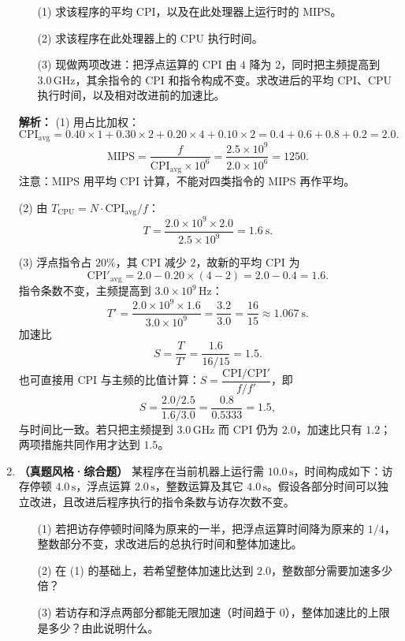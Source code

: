 \begin{enumerate}
\begin{enumerate}
    \item[(1)] 求该程序的平均 CPI，以及在此处理器上运行时的 MIPS。
    \item[(2)] 求该程序在此处理器上的 CPU 执行时间。
    \item[(3)] 现做两项改进：把浮点运算的 CPI 由 $4$ 降为 $2$，同时把主频提高到 $3.0\,\mathrm{GHz}$，其余指令的 CPI 和指令构成不变。求改进后的平均 CPI、CPU 执行时间，以及相对改进前的加速比。
\end{enumerate}

\ifshowsolutions\par\noindent\textbf{解析：}
(1) 用占比加权：
\[
\mathrm{CPI}_{\text{avg}}=0.40\times1+0.30\times2+0.20\times4+0.10\times2
=0.4+0.6+0.8+0.2=2.0.
\]
\[
\text{MIPS}=\frac{f}{\mathrm{CPI}_{\text{avg}}\times10^{6}}
=\frac{2.5\times10^{9}}{2.0\times10^{6}}=1250.
\]
注意：MIPS 用平均 CPI 计算，不能对四类指令的 MIPS 再作平均。

(2) 由 $T_{\text{CPU}}=N\cdot\mathrm{CPI}_{\text{avg}}/f$：
\[
T=\frac{2.0\times10^{9}\times2.0}{2.5\times10^{9}}=1.6\ \mathrm{s}.
\]

(3) 浮点指令占 $20\%$，其 CPI 减少 $2$，故新的平均 CPI 为
\[
\mathrm{CPI}'_{\text{avg}}=2.0-0.20\times(4-2)=2.0-0.4=1.6.
\]
指令条数不变，主频提高到 $3.0\times10^{9}\,\mathrm{Hz}$：
\[
T'=\frac{2.0\times10^{9}\times1.6}{3.0\times10^{9}}
=\frac{3.2}{3.0}=\frac{16}{15}\approx1.067\ \mathrm{s}.
\]
加速比
\[
S=\frac{T}{T'}=\frac{1.6}{16/15}=1.5.
\]
也可直接用 CPI 与主频的比值计算：$S=\dfrac{\mathrm{CPI}/\mathrm{CPI}'}{f/f'}$，即
\[
S=\frac{2.0/2.5}{1.6/3.0}=\frac{0.8}{0.5333}=1.5,
\]
与时间比一致。若只把主频提到 $3.0\,\mathrm{GHz}$ 而 CPI 仍为 $2.0$，加速比只有 $1.2$；两项措施共同作用才达到 $1.5$。

\par\noindent{}\par\noindent{}\par\noindent{}\else \answerarea[10] \fi

\item \textbf{（真题风格·综合题）} 某程序在当前机器上运行需 $10.0\,\mathrm{s}$，时间构成如下：访存停顿 $4.0\,\mathrm{s}$，浮点运算 $2.0\,\mathrm{s}$，整数运算及其它 $4.0\,\mathrm{s}$。假设各部分时间可以独立改进，且改进后程序执行的指令条数与访存次数不变。

\begin{enumerate}
    \item[(1)] 若把访存停顿时间降为原来的一半，把浮点运算时间降为原来的 $1/4$，整数部分不变，求改进后的总执行时间和整体加速比。
    \item[(2)] 在 (1) 的基础上，若希望整体加速比达到 $2.0$，整数部分需要加速多少倍？
    \item[(3)] 若访存和浮点两部分都能无限加速（时间趋于 $0$），整体加速比的上限是多少？由此说明什么。
\end{enumerate}


\end{enumerate}
